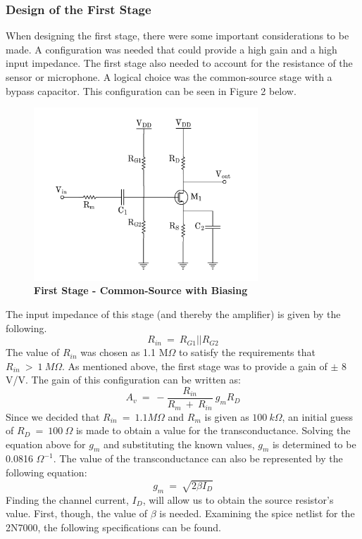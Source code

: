 \documentclass{article}
\begin{document}
    \subsubsection{Design of the First Stage}
    When designing the first stage, there were some important considerations to be made. A configuration was needed that could provide a high gain and a high input impedance. The first stage also needed to account for the resistance of the sensor or microphone. A logical choice was the common-source stage with a bypass capacitor. This configuration can be seen in Figure 2 below.
    \begin{figure}[H]
    	\caption{\textbf{First Stage - Common-Source with Biasing}}
    	\centerline{\includegraphics[width=0.75\textwidth]{first_stage}}
  
    \end{figure}
    \noindent The input impedance of this stage (and thereby the amplifier) is given by the following.
    $$ R_{in}\ =\ R_{G1}||R_{G2} $$
    The value of $R_{in}$ was chosen as 1.1 M$\Omega$ to satisfy the requirements that $R_{in}\ >\ 1\ M\Omega$. As mentioned above, the first stage was to provide a gain of $\pm$ 8 V/V. The gain of this configuration can be written as: \\
    $$ A_v\ =\ -\frac{R_{in}}{R_m\ +\ R_{in}}\ g_mR_D $$
    Since we decided that $R_{in}\ =\ 1.1M\Omega$ and $R_m$ is given as $100\ k\Omega$, an initial guess of $R_D\ =\ 100\ \Omega$ is made to obtain a value for the transconductance. Solving the equation above for $g_m$ and substituting the known values, $g_m$ is determined to be 0.0816 $\Omega^{-1}$. The value of the transconductance can also be represented by the following equation: 
    $$ g_m\ =\ \sqrt{2\beta I_D} $$
    Finding the channel current, $I_D$, will allow us to obtain the source resistor's value. First, though, the value of $\beta$ is needed. Examining the spice netlist for the 2N7000, the following specifications can be found.
\end{document}
